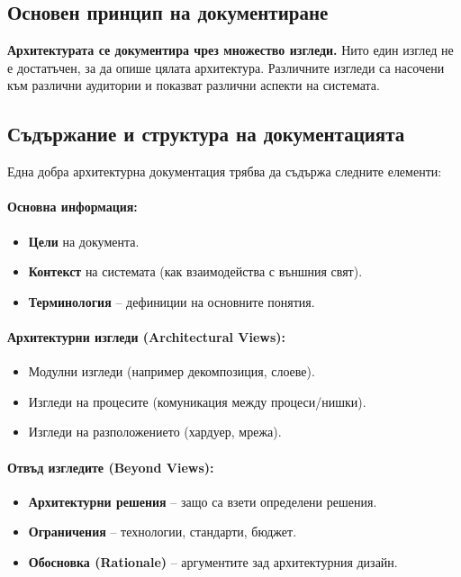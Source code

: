 \documentclass{scrartcl}
\begin{document}
\begin{FlushLeft}
\subsection{Основен принцип на документиране}

\textbf{Архитектурата се документира чрез множество изгледи.} Нито един изглед не е достатъчен, за да опише цялата архитектура. Различните изгледи са насочени към различни аудитории и показват различни аспекти на системата.

\subsection{Съдържание и структура на документацията}

Една добра архитектурна документация трябва да съдържа следните елементи:

\paragraph{Основна информация:}
\begin{itemize}
    \item \textbf{Цели} на документа.
    \item \textbf{Контекст} на системата (как взаимодейства с външния свят).
    \item \textbf{Терминология} – дефиниции на основните понятия.
\end{itemize}

\paragraph{Архитектурни изгледи (Architectural Views):}
\begin{itemize}
    \item Модулни изгледи (например декомпозиция, слоеве).
    \item Изгледи на процесите (комуникация между процеси/нишки).
    \item Изгледи на разположението (хардуер, мрежа).
\end{itemize}

\paragraph{Отвъд изгледите (Beyond Views):}
\begin{itemize}
    \item \textbf{Архитектурни решения} – защо са взети определени решения.
    \item \textbf{Ограничения} – технологии, стандарти, бюджет.
    \item \textbf{Обосновка (Rationale)} – аргументите зад архитектурния дизайн.
\end{itemize}


\end{FlushLeft}
\end{document}
